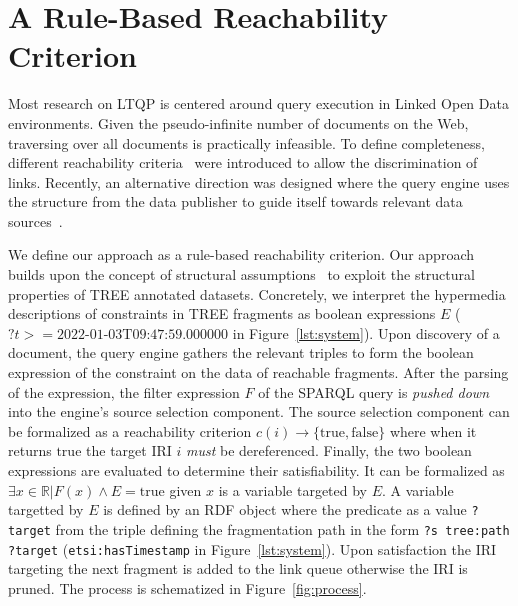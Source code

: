 \section{A Rule-Based Reachability Criterion}



Most research on LTQP is centered around query execution in Linked Open Data environments.
Given the pseudo-infinite number of documents on the Web, traversing over all documents is practically infeasible.
To define completeness, different reachability criteria~\cite{hartig2012} were introduced to allow the discrimination of links.
Recently, an alternative direction was designed where the query engine uses the structure from the data publisher to guide itself towards relevant data sources~\cite{taelman2023, verborgh2020}.

We define our approach as a rule-based reachability criterion.
Our approach builds upon the concept of structural assumptions~\cite{taelman2023} to exploit the structural properties of TREE annotated datasets.
Concretely, we interpret the hypermedia descriptions of constraints in TREE fragments as boolean expressions $E$ ($?t>= \text{2022-01-03T09:47:59.000000}$ in Figure~\ref{lst:system}).
Upon discovery of a document, the query engine gathers the relevant triples to form the boolean expression of the constraint on the data of reachable fragments.
After the parsing of the expression, the filter expression $F$ of the SPARQL query is \textit{pushed down} into the engine's source selection component.
The source selection component can be formalized as a reachability criterion $c(i) \rightarrow \{\mathrm{true}, \mathrm{false}\}$ where when it returns $\mathrm{true}$ the target IRI $i$ \emph{must} be dereferenced.
Finally, the two boolean expressions are evaluated to determine their satisfiability.
It can be formalized as $\exists x\in\mathbb{R} | F(x) \land E = \mathrm{true}$ given $x$ is a variable targeted by $E$.
A variable targetted by $E$ is defined by an RDF object where the predicate as a value \texttt{?target} from the triple
defining the fragmentation path in the form \texttt{?s tree:path ?target} (\texttt{etsi:hasTimestamp} in Figure~\ref{lst:system}).
Upon satisfaction the IRI targeting the next fragment is added to the link queue otherwise the IRI is pruned.
The process is schematized in Figure~\ref{fig:process}.

